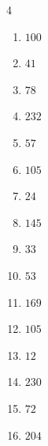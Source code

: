\begin{multicols}{4}
\begin{enumerate}
  \item $100$


  \item $41$


  \item $78$


  \item $232$


  \item $57$


  \item $105$


  \item $24$


  \item $145$


  \item $33$


  \item $53$


  \item $169$


  \item $105$


  \item $12$


\columnbreak %

  \item $230$


  \item $72$


  \item $204$


\end{enumerate}
\end{multicols}
